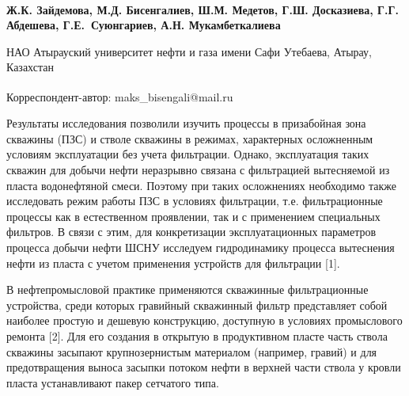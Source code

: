 
\begin{articleheader}

{\bfseries
Ж.К. Зайдемова,
М.Д. Бисенгалиев\textsuperscript{\envelope },
Ш.М. Медетов,
Г.Ш. Досказиева,
Г.Г. Абдешева,
Г.Е.~Суюнгариев,
А.Н. Мукамбеткалиева
}
\end{articleheader}

\begin{affiliation}
НАО Атырауский университет нефти и газа имени Сафи Утебаева, Атырау, Казахстан

\raggedright \textsuperscript{\envelope }Корреспондент-автор: maks\_bisengali@mail.ru
\end{affiliation}

Результаты исследования позволили изучить процессы в призабойная зона
скважины (ПЗС) и стволе скважины в режимах, характерных осложненным
условиям эксплуатации без учета фильтрации. Однако, эксплуатация таких
скважин для добычи нефти неразрывно связана с фильтрацией вытесняемой из
пласта водонефтяной смеси. Поэтому при таких осложнениях необходимо
также исследовать режим работы ПЗС в условиях фильтрации, т.е.
фильтрационные процессы как в естественном проявлении, так и с
применением специальных фильтров. В связи с этим, для конкретизации
эксплуатационных параметров процесса добычи нефти ШСНУ исследуем
гидродинамику процесса вытеснения нефти из пласта с учетом применения
устройств для фильтрации {[}1{]}.

В нефтепромысловой практике применяются скважинные фильтрационные
устройства, среди которых гравийный скважинный фильтр представляет собой
наиболее простую и дешевую конструкцию, доступную в условиях
промыслового ремонта {[}2{]}. Для его создания в открытую в продуктивном
пласте часть ствола скважины засыпают крупнозернистым материалом
(например, гравий) и для предотвращения выноса засыпки потоком нефти в
верхней части ствола у кровли пласта устанавливают пакер сетчатого типа.

